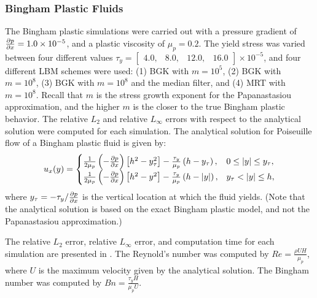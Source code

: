 \subsubsection{Bingham Plastic Fluids} \label{sec:poise-bing}

The Bingham plastic simulations were carried out with a pressure gradient of $\frac{\partial p}{\partial x} = 1.0 \times 10^{-5}$, and a plastic viscosity of $\mu_p = 0.2$.
The yield stress was varied between four different values $\tau_y = \begin{bmatrix}4.0,&8.0,&12.0,&16.0\end{bmatrix} \times 10^{-5}$, and four different LBM schemes were used: (1) BGK with $m = 10^5$, (2) BGK with $m = 10^8$, (3) BGK with $m = 10^8$ and the median filter, and (4) MRT with $m = 10^8$. 
Recall that $m$ is the stress growth exponent for the Papanastasiou approximation, and the higher $m$ is the closer to the true Bingham plastic behavior.
The relative $L_2$ and relative $L_{\infty}$ errors with respect to the analytical solution were computed for each simulation.
The analytical solution for Poiseuille flow of a Bingham plastic fluid is given by:
\begin{equation} \label{eq:analytical-bingham}
u_x(y) = \begin{cases}
\frac{1}{2 \mu_p} \left(-\frac{\partial p}{\partial x}\right) \left[h^2 - y_{\tau}^2 \right] - \frac{\tau_y}{\mu_p} \left(h - y_{\tau}\right), & 0 \leq |y| \leq y_{\tau}, \\
\frac{1}{2 \mu_p} \left(-\frac{\partial p}{\partial x}\right) \left[h^2 - y^2 \right] - \frac{\tau_y}{\mu_p} \left(h - |y|\right), & y_{\tau} < |y| \leq h,
\end{cases}
\end{equation}
\noindent where $y_{\tau} = -\tau_y / \frac{\partial p}{\partial x}$ is the vertical location at which the fluid yields.
(Note that the analytical solution is based on the exact Bingham plastic model, and not the Papanastasiou approximation.)

The relative $L_2$ error, relative $L_{\infty}$ error, and computation time for each simulation are presented in .
The Reynold's number was computed by $Re = \frac{\rho U H}{\mu_p}$, where $U$ is the maximum velocity given by the analytical solution.
The Bingham number was computed by $Bn = \frac{\tau_y H}{\mu_p U}$.

